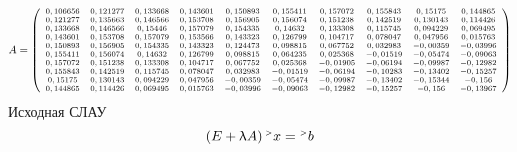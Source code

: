 \documentclass[12pt]{article}
\begin{document}
\begin{equation*}
	\scriptsize
	A =  \left(
	\begin{array}{cccccccccc}
0,106656 & 0,121277 & 0,133668 & 0,143601 & 0,150893 & 0,155411 & 0,157072 & 0,155843 & 0,15175 & 0,144865 \\
0,121277 & 0,135663 & 0,146566 & 0,153708 & 0,156905 & 0,156074 & 0,151238 & 0,142519 & 0,130143 & 0,114426 \\
0,133668 & 0,146566 & 0,15446 & 0,157079 & 0,154335 & 0,14632 & 0,133308 & 0,115745 & 0,094229 & 0,069495 \\
0,143601 & 0,153708 & 0,157079 & 0,153566 & 0,143323 & 0,126799 & 0,104717 & 0,078047 & 0,047956 & 0,015763 \\
0,150893 & 0,156905 & 0,154335 & 0,143323 & 0,124473 & 0,098815 & 0,067752 & 0,032983 & -0,00359 & -0,03996 \\
0,155411 & 0,156074 & 0,14632 & 0,126799 & 0,098815 & 0,064235 & 0,025368 & -0,01519 & -0,05474 & -0,09063 \\
0,157072 & 0,151238 & 0,133308 & 0,104717 & 0,067752 & 0,025368 & -0,01905 & -0,06194 & -0,09987 & -0,12982 \\
0,155843 & 0,142519 & 0,115745 & 0,078047 & 0,032983 & -0,01519 & -0,06194 & -0,10283 & -0,13402 & -0,15257 \\
0,15175 & 0,130143 & 0,094229 & 0,047956 & -0,00359 & -0,05474 & -0,09987 & -0,13402 & -0,15344 & -0,156 \\
0,144865 & 0,114426 & 0,069495 & 0,015763 & -0,03996 & -0,09063 & -0,12982 & -0,15257 & -0,156 & -0,13967 		
	\end{array}
	\right)
\end{equation*}
\normalsize
Исходная СЛАУ
\begin{equation*}
	\left(E + \uplambda A  \right) {}^{\mathsmaller{>}} x = 
		{}^{\mathsmaller{>}} b
\end{equation*}
\end{document}
